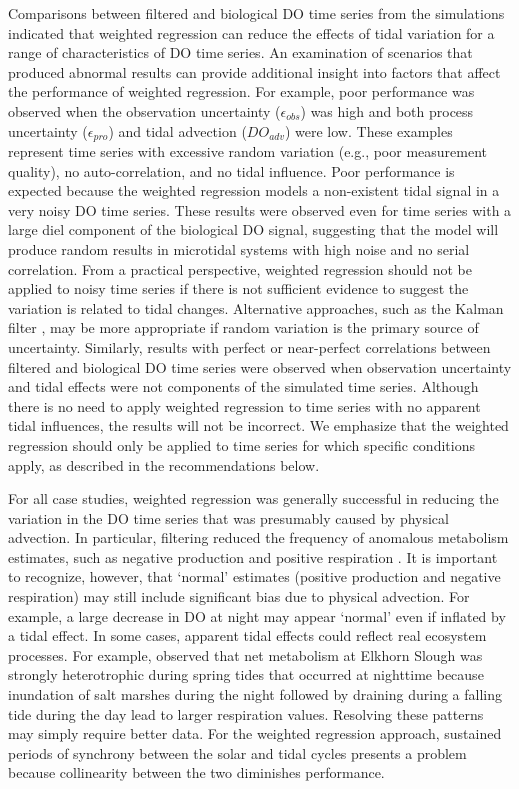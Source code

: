 \documentclass[letterpaper,12pt,oneside]{article}\usepackage[]{graphicx}\usepackage[]{color}
\begin{document}
Comparisons between filtered and biological \ac{DO} time series from the simulations indicated that weighted regression can reduce the effects of tidal variation for a range of characteristics of \ac{DO} time series.  An examination of scenarios that produced abnormal results can provide additional insight into factors that affect the performance of weighted regression.  For example, poor performance was observed when the observation uncertainty ($\epsilon_{obs}$) was high and both process uncertainty ($\epsilon_{pro}$) and tidal advection ($DO_{adv}$) were low.  These examples represent time series with excessive random variation (e.g., poor measurement quality), no auto-correlation, and no tidal influence.  Poor performance is expected because the weighted regression models a non-existent tidal signal in a very noisy \ac{DO} time series.  These results were observed even for time series with a large diel component of the biological \ac{DO} signal, suggesting that the model will produce random results in microtidal systems with high noise and no serial correlation.  From a practical perspective, weighted regression should not be applied to noisy time series if there is not sufficient evidence to suggest the variation is related to tidal changes.  Alternative approaches, such as the Kalman filter \citep{Harvey89,Batt12}, may be more appropriate if random variation is the primary source of uncertainty.  Similarly, results with perfect or near-perfect correlations between filtered and biological \ac{DO} time series were observed when observation uncertainty and tidal effects were not components of the simulated time series.  Although there is no need to apply weighted regression to time series with no apparent tidal influences, the results will not be incorrect.  We emphasize that the weighted regression should only be applied to time series for which specific conditions apply, as described in the recommendations below.  

For all case studies, weighted regression was generally successful in reducing the variation in the \ac{DO} time series that was presumably caused by physical advection.  In particular, filtering reduced the frequency of anomalous metabolism estimates, such as negative production and positive respiration \citep{Needoba12}.  It is important to recognize, however, that `normal' estimates (positive production and negative respiration) may still include significant bias due to physical advection.  For example, a large decrease in \ac{DO} at night may appear `normal' even if inflated by a tidal effect.  In some cases, apparent tidal effects could reflect real ecosystem processes. For example, \citet{Nidzieko14} observed that net metabolism at Elkhorn Slough was strongly heterotrophic during spring tides that occurred at nighttime because inundation of salt marshes during the night followed by draining during a falling tide during the day lead to larger respiration values.  Resolving these patterns may simply require better data.  For the weighted regression approach, sustained periods of synchrony between the solar and tidal cycles presents a problem because collinearity between the two diminishes performance. 
\end{document}
